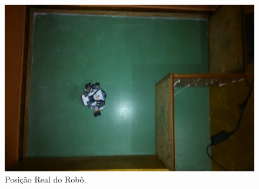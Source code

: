 \begin{figure}[H]
  \centering
  \includegraphics[scale=0.8]{figuras/cen2_ex5/real.eps}
  \caption[Posição real do Robô]{Posição Real do Robô.}
  \label{img:cen2_ex5_6}
\end{figure}
